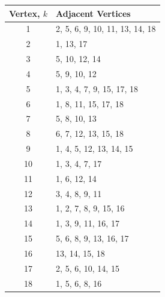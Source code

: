 \documentclass{article}
\begin{document}
\begin{table}[h!]
  \begin{center}
    \begin{tabular}{|c||l|}
    \hline
    
      Vertex, $k$   & Adjacent Vertices \\

    \hline
    \hline

      1 & 2, 5, 6, 9, 10, 11, 13, 14, 18 \\
        \hline
      2 & 1, 13, 17  \\
      \hline
      3 & 5, 10, 12, 14 \\
      \hline
      4 & 5, 9, 10, 12 \\
      \hline
      5 & 1, 3, 4, 7, 9, 15, 17, 18 \\
      \hline
      6 & 1, 8, 11, 15, 17, 18 \\
      \hline
      7 & 5, 8, 10, 13 \\
      \hline
      8 & 6, 7, 12, 13, 15, 18 \\
      \hline
      9 & 1, 4, 5, 12, 13, 14, 15  \\
      \hline
      10 & 1, 3, 4, 7, 17  \\
      \hline
      11 & 1, 6, 12, 14  \\
      \hline
      12 & 3, 4, 8, 9, 11 \\
      \hline
      13 & 1, 2, 7, 8, 9, 15, 16 \\
      \hline
      14 & 1, 3, 9, 11, 16, 17  \\
      \hline
      15 & 5, 6, 8, 9, 13, 16, 17 \\
      \hline
      16 & 13, 14, 15, 18 \\
      \hline
      17 & 2, 5, 6, 10, 14, 15 \\
      \hline
      18 & 1, 5, 6, 8, 16 \\
      \hline
    \end{tabular}
  \end{center}
\label{tab:adjacent vertices}
\end{table}
\end{document}
